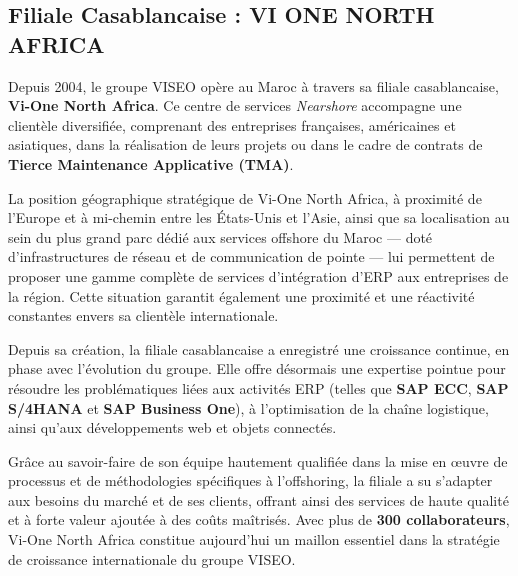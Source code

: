 \documentclass[12pt,a4paper,oneside]{report}
\begin{document}
\subsection{Filiale Casablancaise : VI ONE NORTH AFRICA}\label{ch1:filiale}

Depuis 2004, le groupe VISEO op\`ere au Maroc \`a travers sa filiale casablancaise,
\textbf{Vi-One North Africa}. Ce centre de services \textit{Nearshore} accompagne une
client\`ele diversifi\'ee, comprenant des entreprises fran\c{c}aises, am\'ericaines et
asiatiques, dans la r\'ealisation de leurs projets ou dans le cadre de contrats de
\textbf{Tierce Maintenance Applicative (TMA)}.

La position g\'eographique strat\'egique de Vi-One North Africa, \`a proximit\'e de
l'Europe et \`a mi-chemin entre les \'Etats-Unis et l'Asie, ainsi que sa localisation
au sein du plus grand parc d\'edi\'e aux services offshore du Maroc --- dot\'e
d'infrastructures de r\'eseau et de communication de pointe --- lui permettent de proposer
une gamme compl\`ete de services d'int\'egration d'ERP aux entreprises de la r\'egion.
Cette situation garantit \'egalement une proximit\'e et une r\'eactivit\'e constantes envers
sa client\`ele internationale.

Depuis sa cr\'eation, la filiale casablancaise a enregistr\'e une croissance continue, en
phase avec l'\'evolution du groupe. Elle offre d\'esormais une expertise pointue pour
r\'esoudre les probl\'ematiques li\'ees aux activit\'es ERP (telles que \textbf{SAP ECC},
\textbf{SAP S/4HANA} et \textbf{SAP Business One}), \`a l'optimisation de la cha\^ine
logistique, ainsi qu'aux d\'eveloppements web et objets connect\'es.

Gr\^ace au savoir-faire de son \'equipe hautement qualifi\'ee dans la mise en \oe uvre de
processus et de m\'ethodologies sp\'ecifiques \`a l'offshoring, la filiale a su s'adapter
aux besoins du march\'e et de ses clients, offrant ainsi des services de haute qualit\'e
et \`a forte valeur ajout\'ee \`a des co\^uts ma\^itris\'es. Avec plus de
\textbf{300 collaborateurs}, Vi-One North Africa constitue aujourd'hui un maillon
essentiel dans la strat\'egie de croissance internationale du groupe VISEO.

\vspace{0.4cm}
\end{document}
